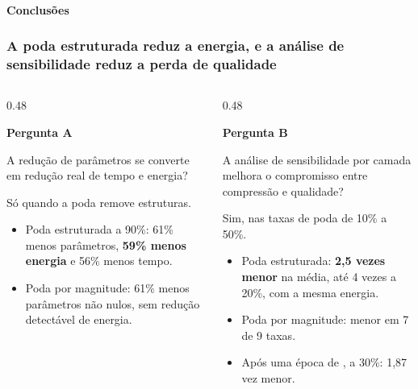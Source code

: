 \newcommand{\pergunta}[2]{%
  {\fontsize{8.5}{10.5}\selectfont\color{destaque}\textbf{Pergunta #1}\par}\vspace{0.8mm}
  {\fontsize{9}{11.5}\selectfont\color{tintaSec}\raggedright #2\par}\vspace{2.2mm}}
\newcommand{\resposta}[1]{{\fontsize{10.5}{13}\selectfont\bfseries\raggedright #1\par}\vspace{2.2mm}}

\begin{frame}
\framesubtitle{Conclusões}
\frametitle{A poda estruturada reduz a energia, e a análise de sensibilidade reduz
a perda de qualidade}
\vspace{1mm}
\begin{columns}[T,onlytextwidth]
\begin{column}{0.48\textwidth}
\pergunta{A}{A redução de parâmetros se converte em redução real de tempo e
energia?}
\resposta{Só quando a poda remove estruturas.}
\begin{itemize}
  \setlength{\itemsep}{2mm}
  \item Poda estruturada a 90\%: 61\% menos parâmetros, \textbf{59\% menos energia} e
        56\% menos tempo.
  \item Poda por magnitude: 61\% menos parâmetros não nulos, sem redução detectável
        de energia.
\end{itemize}
\end{column}
\begin{column}{0.48\textwidth}
\pergunta{B}{A análise de sensibilidade por camada melhora o compromisso entre
compressão e qualidade?}
\resposta{Sim, nas taxas de poda de 10\% a 50\%.}
\begin{itemize}
  \setlength{\itemsep}{2mm}
  \item Poda estruturada: \ppl{} \textbf{2,5 vezes menor} na média, até 4 vezes
        a 20\%, com a mesma energia.
  \item Poda por magnitude: menor \ppl{} em 7 de 9 taxas.
  \item Após uma época de \ft, a 30\%: \ppl{} 1,87 vez menor.
\end{itemize}
\end{column}
\end{columns}
\end{frame}

